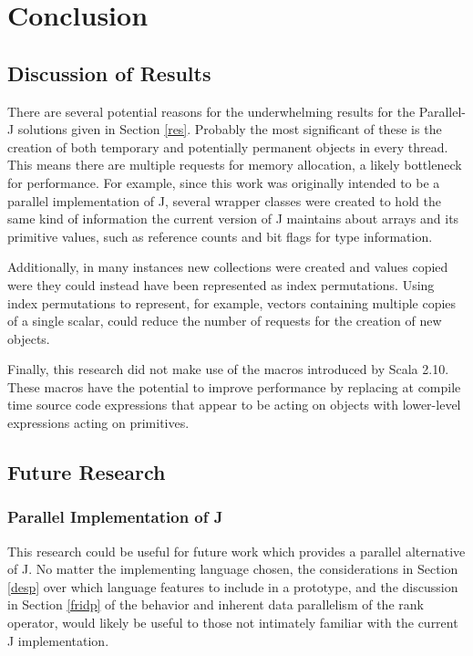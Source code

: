 \chapter{Conclusion}
\label{conc}

\section{Discussion of Results}
\label{discres}
There are several potential reasons for the underwhelming results for the Parallel-J solutions given in Section \ref{res}. 
Probably the most significant of these is the creation of both temporary 
and potentially permanent objects in every thread. 
This means there are multiple requests for memory allocation, a likely bottleneck for performance.
For example, since this work was originally intended to be a parallel implementation of J, 
several wrapper classes were created to hold the same kind of information the current version of J \cite{ioj} 
maintains about arrays and its primitive values, such as reference counts and bit flags for type information. 

Additionally, in many instances new collections were created and values copied 
were they could instead have been represented as index permutations. %
Using index permutations to represent, for example, vectors containing multiple copies of a single scalar, 
could reduce the number of requests for the creation of new objects.

Finally, this research did not make use of the macros introduced by Scala 2.10. %
These macros have the potential to improve performance 
by replacing at compile time source code expressions that appear to be acting on objects 
with lower-level expressions acting on primitives.

\section{Future Research}
\subsection{Parallel Implementation of J}
This research could be useful for future work which provides 
a parallel alternative of J.
No matter the implementing language chosen, 
the considerations in Section \ref{desp} 
over which language features to include in a prototype, 
and the discussion in Section \ref{fridp} of the behavior and inherent data parallelism of the rank operator, 
would likely be useful to those not intimately familiar with the current J implementation.

